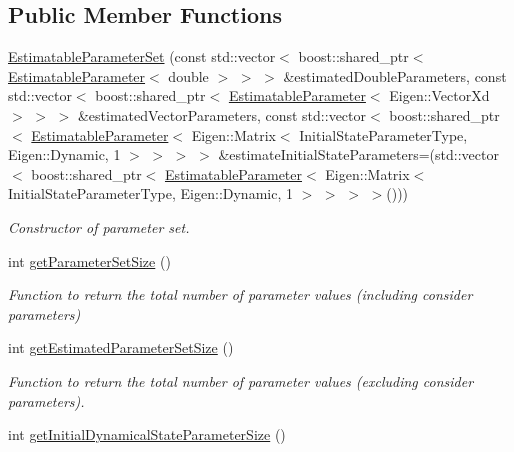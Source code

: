 \subsection*{Public Member Functions}
\begin{DoxyCompactItemize}
\item 
\hyperlink{classtudat_1_1estimatable__parameters_1_1EstimatableParameterSet_afd05a345c7ad5543713cbc1027081f32}{Estimatable\+Parameter\+Set} (const std\+::vector$<$ boost\+::shared\+\_\+ptr$<$ \hyperlink{classtudat_1_1estimatable__parameters_1_1EstimatableParameter}{Estimatable\+Parameter}$<$ double $>$ $>$ $>$ \&estimated\+Double\+Parameters, const std\+::vector$<$ boost\+::shared\+\_\+ptr$<$ \hyperlink{classtudat_1_1estimatable__parameters_1_1EstimatableParameter}{Estimatable\+Parameter}$<$ Eigen\+::\+Vector\+Xd $>$ $>$ $>$ \&estimated\+Vector\+Parameters, const std\+::vector$<$ boost\+::shared\+\_\+ptr$<$ \hyperlink{classtudat_1_1estimatable__parameters_1_1EstimatableParameter}{Estimatable\+Parameter}$<$ Eigen\+::\+Matrix$<$ Initial\+State\+Parameter\+Type, Eigen\+::\+Dynamic, 1 $>$ $>$ $>$ $>$ \&estimate\+Initial\+State\+Parameters=(std\+::vector$<$ boost\+::shared\+\_\+ptr$<$ \hyperlink{classtudat_1_1estimatable__parameters_1_1EstimatableParameter}{Estimatable\+Parameter}$<$ Eigen\+::\+Matrix$<$ Initial\+State\+Parameter\+Type, Eigen\+::\+Dynamic, 1 $>$ $>$ $>$ $>$()))
\begin{DoxyCompactList}\small\item\em Constructor of parameter set. \end{DoxyCompactList}\item 
int \hyperlink{classtudat_1_1estimatable__parameters_1_1EstimatableParameterSet_ac9c2d399b936c6be1b9a2a01970b2897}{get\+Parameter\+Set\+Size} ()
\begin{DoxyCompactList}\small\item\em Function to return the total number of parameter values (including consider parameters) \end{DoxyCompactList}\item 
int \hyperlink{classtudat_1_1estimatable__parameters_1_1EstimatableParameterSet_aa714a41045e2e07cac5153ec5ded1549}{get\+Estimated\+Parameter\+Set\+Size} ()
\begin{DoxyCompactList}\small\item\em Function to return the total number of parameter values (excluding consider parameters). \end{DoxyCompactList}\item 
int \hyperlink{classtudat_1_1estimatable__parameters_1_1EstimatableParameterSet_a03a696e7e075391931b97885c2729808}{get\+Initial\+Dynamical\+State\+Parameter\+Size} ()

\end{DoxyCompactItemize}
